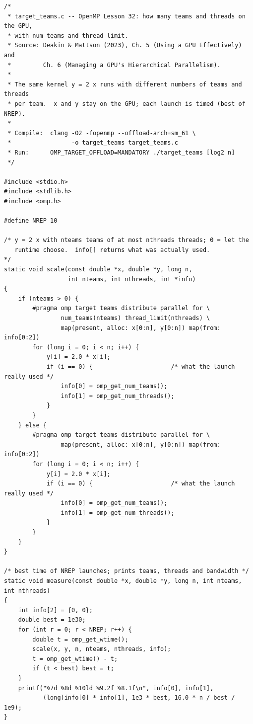 \documentclass[11pt,a4paper]{article}
\let\origtexttt\texttt
\renewcommand{\texttt}[1]{\textcolor{black!60}{\origtexttt{#1}}}
\begin{document}
\begin{lstlisting}[caption={\textbf{\origtexttt{target\_teams.c}} -- the same kernel launched with different numbers of teams and threads.}, label={lst:teams}]
/*
 * target_teams.c -- OpenMP Lesson 32: how many teams and threads on the GPU,
 * with num_teams and thread_limit.
 * Source: Deakin & Mattson (2023), Ch. 5 (Using a GPU Effectively) and
 *         Ch. 6 (Managing a GPU's Hierarchical Parallelism).
 *
 * The same kernel y = 2 x runs with different numbers of teams and threads
 * per team.  x and y stay on the GPU; each launch is timed (best of NREP).
 *
 * Compile:  clang -O2 -fopenmp --offload-arch=sm_61 \
 *                 -o target_teams target_teams.c
 * Run:      OMP_TARGET_OFFLOAD=MANDATORY ./target_teams [log2 n]
 */

#include <stdio.h>
#include <stdlib.h>
#include <omp.h>

#define NREP 10

/* y = 2 x with nteams teams of at most nthreads threads; 0 = let the
   runtime choose.  info[] returns what was actually used.              */
static void scale(const double *x, double *y, long n,
                  int nteams, int nthreads, int *info)
{
    if (nteams > 0) {
        #pragma omp target teams distribute parallel for \
                num_teams(nteams) thread_limit(nthreads) \
                map(present, alloc: x[0:n], y[0:n]) map(from: info[0:2])
        for (long i = 0; i < n; i++) {
            y[i] = 2.0 * x[i];
            if (i == 0) {                      /* what the launch really used */
                info[0] = omp_get_num_teams();
                info[1] = omp_get_num_threads();
            }
        }
    } else {
        #pragma omp target teams distribute parallel for \
                map(present, alloc: x[0:n], y[0:n]) map(from: info[0:2])
        for (long i = 0; i < n; i++) {
            y[i] = 2.0 * x[i];
            if (i == 0) {                      /* what the launch really used */
                info[0] = omp_get_num_teams();
                info[1] = omp_get_num_threads();
            }
        }
    }
}

/* best time of NREP launches; prints teams, threads and bandwidth */
static void measure(const double *x, double *y, long n, int nteams, int nthreads)
{
    int info[2] = {0, 0};
    double best = 1e30;
    for (int r = 0; r < NREP; r++) {
        double t = omp_get_wtime();
        scale(x, y, n, nteams, nthreads, info);
        t = omp_get_wtime() - t;
        if (t < best) best = t;
    }
    printf("%7d %8d %10ld %9.2f %8.1f\n", info[0], info[1],
           (long)info[0] * info[1], 1e3 * best, 16.0 * n / best / 1e9);
}


\end{lstlisting}
\end{document}
